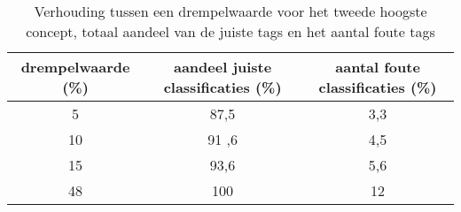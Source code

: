 \begin{table}
	\renewcommand\arraystretch{1.2}
	\centering
	\begin{tabular}{*{3}{c}}
		\toprule
		drempelwaarde (\%) & aandeel juiste classificaties (\%) & aantal foute classificaties (\%) \\
		\midrule
		5 & 87,5 & 3,3 \\
		[\smallskipamount]
		10 & 91 ,6& 4,5 \\
		[\smallskipamount]
		15 & 93,6 & 5,6 \\
		[\smallskipamount]
		48 & 100 & 12 \\
		\bottomrule
	\end{tabular}
	\caption{Verhouding tussen een drempelwaarde voor het tweede hoogste concept, totaal aandeel van de juiste tags en het aantal foute tags}
	\label{tab:drempelwaarde-custom-tag2}
\end{table}

